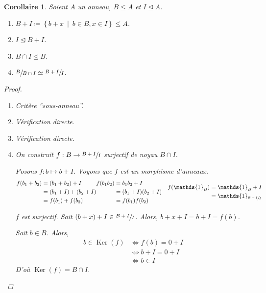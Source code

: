 \documentclass{report}
\newtheorem*{coro}{Corollaire}
\theoremstyle{definition}
\theoremstyle{remark}
\def\lte{\leqslant}
\def\id{\mathds{1}}
\def\noyau{\operatorname{Ker}}
\begin{document}
	\begin{coro}
		Soient $A$ un anneau, $B\lte A$ et $I\trianglelefteq A$.
		\begin{enumerate}
			\item $B+I \coloneq \left\{ b+x ~\middle|~ b\in B, x\in I \right\} \lte A$.
			\item $I\trianglelefteq B+I$.
			\item $B\cap I\trianglelefteq B$.
			\item $\sfrac{B}{B\cap I} \simeq \sfrac{B+I}{I}$.
		\end{enumerate}

		\begin{proof}
			\begin{enumerate}
				\item Crit\`ere ``sous-anneau''.
				\item V\'erification directe.
				\item V\'erification directe.
				\item On construit $f:B\to \sfrac{B+I}{I}$ surjectif de noyau $B\cap I$.

				Posons $f:b\mapsto b+I$. Voyons que $f$ est un morphisme d'anneaux.
				\begin{align*}
					\begin{split}
						f(b_1+b_2)&= (b_1+b_2)+I\\
						&= (b_1+I)+(b_2+I)\\
						&= f(b_1)+f(b_2)
					\end{split}
					&
					\begin{split}
						f(b_1b_2)&= b_1b_2+I\\
						&= (b_1+I)(b_2+I)\\
						&= f(b_1)f(b_2)
					\end{split}
					&
					\begin{split}
						f(\id_B)&= \id_B+I\\
						&= \id_{\sfrac{B+I}{I}}
					\end{split}
				\end{align*}

				$f$ est surjectif. Soit $(b+x)+I\in \sfrac{B+I}{I}$. Alors, $b+x+I=b+I=f(b)$.

				Soit $b\in B$. Alors,
				\begin{align*}
					b\in \noyau(f)&\Longleftrightarrow f(b)=0+I\\
					&\Longleftrightarrow b+I=0+I\\
					&\Longleftrightarrow b\in I
				\end{align*}
				D'o\`u $\noyau(f)=B\cap I$.
			\end{enumerate}
		\end{proof}
	\end{coro}
\end{document}
